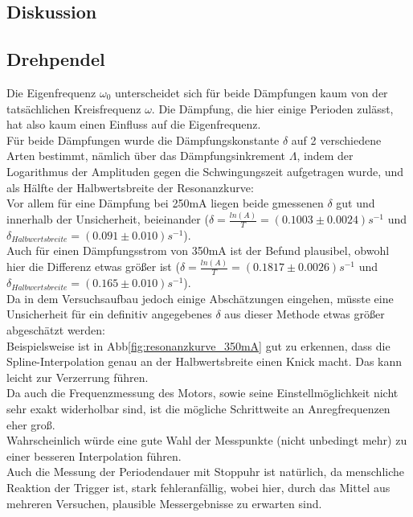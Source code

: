 \documentclass[12pt,a4paper]{article}
\begin{document}
\begin{multicols}{2}


\pagebreak
\section{Diskussion}
\subsection{Drehpendel}
Die Eigenfrequenz $\omega_0$ unterscheidet sich für beide Dämpfungen kaum von der tatsächlichen Kreisfrequenz $\omega$. Die Dämpfung, die hier einige Perioden zulässt, hat also kaum einen Einfluss auf die Eigenfrequenz.\\

Für beide Dämpfungen wurde die Dämpfungskonstante $\delta$ auf 2 verschiedene Arten bestimmt, nämlich über das Dämpfungsinkrement $\Lambda$, indem der Logarithmus der Amplituden gegen die Schwingungszeit aufgetragen wurde, und als Hälfte der Halbwertsbreite der Resonanzkurve:\\
Vor allem für eine Dämpfung bei 250mA liegen beide gmessenen $\delta$ gut und innerhalb der Unsicherheit, beieinander ($\delta = \frac{ln(A)}{T} = (0.1003 \pm 0.0024)s^{-1}$ und $\delta_{Halbwertsbreite} = (0.091 \pm 0.010)s^{-1}$).\\
Auch für einen Dämpfungsstrom von 350mA ist der Befund plausibel, obwohl hier die Differenz etwas größer ist ($\delta = \frac{ln(A)}{T} = (0.1817 \pm 0.0026)s^{-1}$ und $\delta_{Halbwertsbreite} = (0.165 \pm 0.010)s^{-1}$).\\
Da in dem Versuchsaufbau jedoch einige Abschätzungen eingehen, müsste eine Unsicherheit für ein definitiv angegebenes $\delta$ aus dieser Methode etwas größer abgeschätzt werden:\\
Beispielsweise ist in Abb\ref{fig:resonanzkurve_350mA} gut zu erkennen, dass die Spline-Interpolation genau an der Halbwertsbreite einen Knick macht. Das kann leicht zur Verzerrung führen.\\
Da auch die Frequenzmessung des Motors, sowie seine Einstellmöglichkeit nicht sehr exakt widerholbar sind, ist die mögliche Schrittweite an Anregfrequenzen eher groß.\\
Wahrscheinlich würde eine gute Wahl der Messpunkte (nicht unbedingt mehr) zu einer besseren Interpolation führen.\\

Auch die Messung der Periodendauer mit Stoppuhr ist natürlich, da menschliche Reaktion der Trigger ist, stark fehleranfällig, wobei hier, durch das Mittel aus mehreren Versuchen, plausible Messergebnisse zu erwarten sind.\\


\end{multicols}
\end{document}
